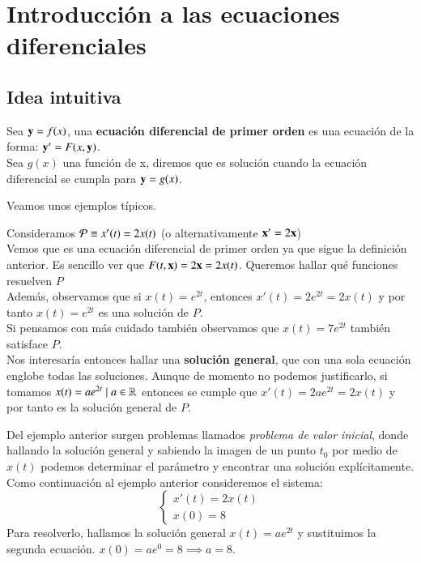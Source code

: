 
\chapter{Introducci\'{o}n a las ecuaciones diferenciales}

\section{Idea intuitiva}
\begin{dfn}
	Sea $\mbf{y} = f(x)$, una \textbf{ecuación diferencial de primer orden} es una ecuación de la forma: $\mbf{y'}=F(x,\mathbf{y})$.\\
    Sea $g(x)$ una función de x, diremos que es solución cuando la ecuación diferencial se cumpla para $\mbf{y} = g(x)$.
\end{dfn}

Veamos unos ejemplos típicos.

\begin{eg}
    Consideramos $\P \equiv x'(t) = 2x(t)$ (o alternativamente $\mbf{x}' = 2\mbf{x}$)\\
    Vemos que es una ecuación diferencial de primer orden ya que sigue la definición anterior. Es sencillo ver que $F(t,\mbf{x}) = 2\mbf{x} = 2x(t)$. Queremos hallar qué funciones resuelven $P$\\
    Además, observamos que si $x(t) = e^{2t}$, entonces $x'(t) = 2e^{2t} = 2x(t)$ y por tanto $x(t) = e^{2t}$ es una solución de $P$.\\Si pensamos con más cuidado también observamos que $x(t) = 7e^{2t}$ también satisface $P$.\\
    Nos interesaría entonces hallar una \textbf{solución general}, que con una sola ecuación englobe todas las soluciones. Aunque de momento no podemos justificarlo, si tomamos $x(t) = ae^{2t} \mid a \in \R$ entonces se cumple que $x'(t) = 2ae^{2t} = 2x(t)$ y por tanto es la solución general de $P$.
\end{eg}

Del ejemplo anterior surgen problemas llamados \textit{problema de valor inicial}, donde hallando la solución general y sabiendo la imagen de un punto $t_0$ por medio de $x(t)$ podemos determinar el parámetro y encontrar una solución explícitamente. Como continuación al ejemplo anterior consideremos el sistema:
$$
    \begin{cases}
        x'(t) = 2x(t) \\ x(0) = 8
    \end{cases}
$$
Para resolverlo, hallamos la solución general $x(t) = ae^{2t}$ y sustituimos la segunda ecuación. $x(0) = ae^{0} = 8 \implies a = 8$.

